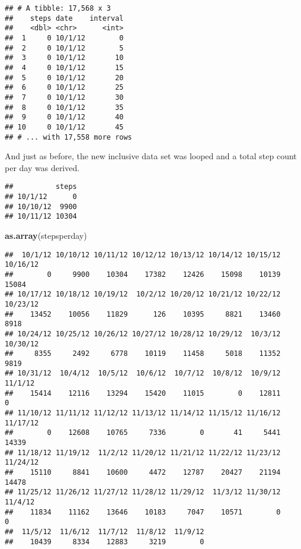 \documentclass[]{article}
\newenvironment{Shaded}{\begin{snugshade}}{\end{snugshade}}
\newcommand{\KeywordTok}[1]{\textcolor[rgb]{0.13,0.29,0.53}{\textbf{#1}}}
\newcommand{\DataTypeTok}[1]{\textcolor[rgb]{0.13,0.29,0.53}{#1}}
\newcommand{\DecValTok}[1]{\textcolor[rgb]{0.00,0.00,0.81}{#1}}
\newcommand{\StringTok}[1]{\textcolor[rgb]{0.31,0.60,0.02}{#1}}
\newcommand{\OperatorTok}[1]{\textcolor[rgb]{0.81,0.36,0.00}{\textbf{#1}}}
\newcommand{\NormalTok}[1]{#1}
\begin{document}
\begin{verbatim}
## # A tibble: 17,568 x 3
##    steps date    interval
##    <dbl> <chr>      <int>
##  1     0 10/1/12        0
##  2     0 10/1/12        5
##  3     0 10/1/12       10
##  4     0 10/1/12       15
##  5     0 10/1/12       20
##  6     0 10/1/12       25
##  7     0 10/1/12       30
##  8     0 10/1/12       35
##  9     0 10/1/12       40
## 10     0 10/1/12       45
## # ... with 17,558 more rows
\end{verbatim}

And just as before, the new inclusive data set was looped and a total
step count per day was derived.

\begin{Shaded}
\end{Shaded}

\begin{verbatim}
##          steps
## 10/1/12      0
## 10/10/12  9900
## 10/11/12 10304
\end{verbatim}

\begin{Shaded}
\begin{Highlighting}[]
\KeywordTok{as.array}\NormalTok{(stepsperday)}
\end{Highlighting}
\end{Shaded}

\begin{verbatim}
##  10/1/12 10/10/12 10/11/12 10/12/12 10/13/12 10/14/12 10/15/12 10/16/12 
##        0     9900    10304    17382    12426    15098    10139    15084 
## 10/17/12 10/18/12 10/19/12  10/2/12 10/20/12 10/21/12 10/22/12 10/23/12 
##    13452    10056    11829      126    10395     8821    13460     8918 
## 10/24/12 10/25/12 10/26/12 10/27/12 10/28/12 10/29/12  10/3/12 10/30/12 
##     8355     2492     6778    10119    11458     5018    11352     9819 
## 10/31/12  10/4/12  10/5/12  10/6/12  10/7/12  10/8/12  10/9/12  11/1/12 
##    15414    12116    13294    15420    11015        0    12811        0 
## 11/10/12 11/11/12 11/12/12 11/13/12 11/14/12 11/15/12 11/16/12 11/17/12 
##        0    12608    10765     7336        0       41     5441    14339 
## 11/18/12 11/19/12  11/2/12 11/20/12 11/21/12 11/22/12 11/23/12 11/24/12 
##    15110     8841    10600     4472    12787    20427    21194    14478 
## 11/25/12 11/26/12 11/27/12 11/28/12 11/29/12  11/3/12 11/30/12  11/4/12 
##    11834    11162    13646    10183     7047    10571        0        0 
##  11/5/12  11/6/12  11/7/12  11/8/12  11/9/12 
##    10439     8334    12883     3219        0
\end{verbatim}
\end{document}
